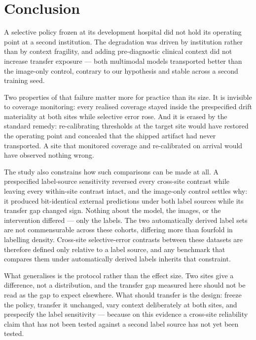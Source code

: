 \section{Conclusion}
\label{sec:conclusion}


A selective policy frozen at its development hospital did not hold its operating
point at a second institution. The degradation was driven by institution rather
than by context fragility, and adding pre-diagnostic clinical context did not
increase transfer exposure --- both multimodal models transported better than
the image-only control, contrary to our hypothesis and stable across a second
training seed.

Two properties of that failure matter more for practice than its size. It is
invisible to coverage monitoring: every realised coverage stayed inside the
prespecified drift materiality at both sites while selective error rose. And it
is erased by the standard remedy: re-calibrating thresholds at the target site
would have restored the operating point and concealed that the shipped artifact
had never transported. A site that monitored coverage and re-calibrated on
arrival would have observed nothing wrong.

The study also constrains how such comparisons can be made at all. A
prespecified label-source sensitivity reversed every cross-site contrast while
leaving every within-site contrast intact, and the image-only control settles
why: it produced bit-identical external predictions under both label sources
while its transfer gap changed sign. Nothing about the model, the images, or
the intervention differed --- only the labels. The two automatically derived
label sets are not commensurable across these cohorts, differing more than
fourfold in labelling density. Cross-site selective-error contrasts between
these datasets are therefore defined only relative to a label source, and any
benchmark that compares them under automatically derived labels inherits that
constraint.

What generalises is the protocol rather than the effect size. Two sites give a
difference, not a distribution, and the transfer gap measured here should not
be read as the gap to expect elsewhere. What should transfer is the design:
freeze the policy, transfer it unchanged, vary context deliberately at both
sites, and prespecify the label sensitivity --- because on this evidence a
cross-site reliability claim that has not been tested against a second label
source has not yet been tested.
